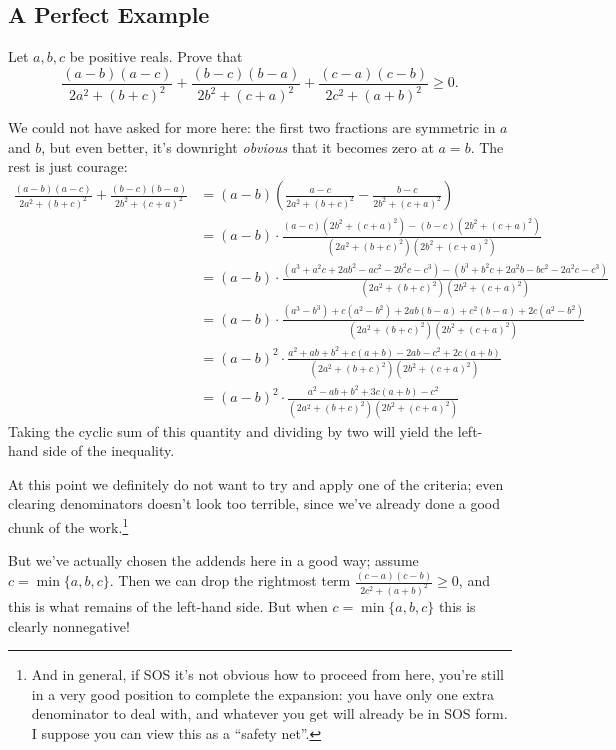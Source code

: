 \documentclass{scrartcl}
\begin{document}
\subsection{A Perfect Example}
\begin{example}
  Let $a,b,c$ be positive reals. Prove that
  \[ \frac{(a-b)(a-c)}{2a^2 + (b+c)^2} + \frac{(b-c)(b-a)}{2b^2 + (c+a)^2} + \frac{(c-a)(c-b)}{2c^2 + (a+b)^2} \geq 0. \]
\end{example}
\begin{soln}
  We could not have asked for more here: the first two fractions are symmetric in $a$ and $b$,
  but even better, it's downright \textit{obvious} that it becomes zero at $a=b$.
  The rest is just courage:
  \begin{align*}
    \frac{(a-b)(a-c)}{2a^2+(b+c)^2} + \frac{(b-c)(b-a)}{2b^2+(c+a)^2}
    &= (a-b) \left( \frac{a-c}{2a^2+(b+c)^2} - \frac{b-c}{2b^2 +(c+a)^2} \right) \\
    &= (a-b) \cdot \frac{(a-c)(2b^2+(c+a)^2) - (b-c)(2b^2+(c+a)^2)}{(2a^2+(b+c)^2)(2b^2+(c+a)^2)} \\
    &= (a-b) \cdot \scriptstyle\frac{\left( a^3+a^2c+2ab^2-ac^2-2b^2c-c^3 \right) - \left( b^3+b^2c+2a^2b-bc^2-2a^2c-c^3 \right)}{(2a^2+(b+c)^2)(2b^2+(c+a)^2)} \\
    &= (a-b) \cdot \textstyle\frac{(a^3-b^3) + c(a^2-b^2) + 2ab(b-a) + c^2(b-a) + 2c(a^2-b^2)}{(2a^2+(b+c)^2)(2b^2+(c+a)^2)} \\
    &= (a-b)^2 \cdot \frac{a^2+ab+b^2 + c(a+b) -2ab - c^2 + 2c(a+b)}{(2a^2+(b+c)^2) (2b^2+(c+a)^2)} \\
    &= (a-b)^2 \cdot \frac{a^2-ab+b^2 + 3c(a+b)-c^2}{(2a^2+(b+c)^2) (2b^2+(c+a)^2)}
  \end{align*}
  Taking the cyclic sum of this quantity and dividing by two will yield
  the left-hand side of the inequality.

  At this point we definitely do not want to try and apply one of the criteria;
  even clearing denominators doesn't look too terrible,
  since we've already done a good chunk of the work.\footnote{And in general,
    if SOS it's not obvious how to proceed from here,
    you're still in a very good position to complete the expansion:
    you have only one extra denominator to deal with, and whatever you get will already be in SOS form.
    I suppose you can view this as a ``safety net''.}

  But we've actually chosen the addends here in a good way; assume $c = \min \{a,b,c\}$.
  Then we can drop the rightmost term $\frac{(c-a)(c-b)}{2c^2+(a+b)^2} \ge 0$,
  and this is what remains of the left-hand side.
  But when $c = \min \{a,b,c\}$ this is clearly nonnegative!
\end{soln}
\end{document}
